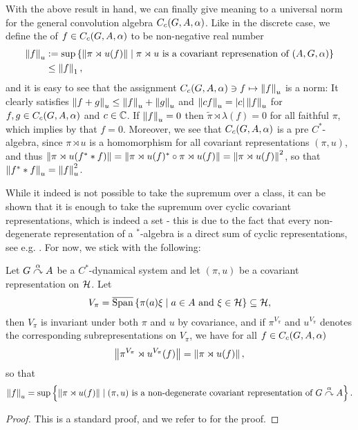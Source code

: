 With the above result in hand, we can finally give meaning to a universal norm for the general convolution algebra $C_c(G,A,\alpha)$. Like in the discrete case, we define the  of $f \in C_c(G,A,\alpha)$ to be non-negative real number
\begin{align*}
	\left\lVert f \right\rVert_u &:= \sup\left\{ \left\lVert \pi \rtimes u (f)\right\rVert \mid  \pi \rtimes u \text{ is a covariant represenation of }(A,G ,\alpha) \right\}\\
	&\leq \left\lVert f \right\rVert_1,
\end{align*}
and it is easy to see that the assignment $C_c(G,A,\alpha) \ni f \mapsto \left\lVert f \right\rVert_u$ is a norm: It clearly satisfies $\left\lVert f + g \right\rVert_u \leq \left\lVert f \right\rVert_u + \left\lVert g \right\rVert_u$ and $\left\lVert cf \right\rVert_u = |c| \left\lVert f \right\rVert_u$ for $f,g \in C_c(G,A,\alpha)$ and $c \in \mathbb{C}$. If $\left\lVert f \right\rVert_u = 0$ then $\tilde{\pi} \rtimes \lambda (f) = 0$ for all faithful $\pi$, which implies by  that $f = 0$. Moreover, we see that $C_c(G,A,\alpha)$ is a pre $C^*$-algebra, since $\pi \rtimes u$ is a homomorphism for all covariant representations $(\pi,u)$, and thus $\left\lVert \pi \rtimes u (f^*\ast f)\right\rVert = \left\lVert \pi \rtimes u(f)^* \circ \pi \rtimes u(f)\right\rVert = \left\lVert \pi \rtimes u (f)\right\rVert^2$, so that $\left\lVert f^* \ast f\right\rVert_u = \left\lVert f \right\rVert_u^2$. 
\begin{note}
	While it indeed is not possible to take the supremum over a class, it can be shown that it is enough to take the supremum over cyclic covariant representations, which is indeed a set - this is due to the fact that every non-degenerate representation of a $^*$-algebra is a direct sum of cyclic representations, see e.g. \cite[Theorem 5.1.3]{murphy2014c}. For now, we stick with the following:
\end{note}
\begin{lemma}
	Let $G \stackrel{\alpha}{\curvearrowright} A$ be a $C^*$-dynamical system and let $(\pi,u)$ be a covariant representation on $\mathcal{H}$. Let 
	\begin{align*}
		V_\pi = \overline {\mathrm{Span}}\left\{ \pi(a) \xi \mid a \in A \text{ and } \xi \in \mathcal{H} \right\} \subseteq \mathcal{H},
	\end{align*}
	then $V_\pi$ is invariant under both $\pi$ and $u$ by covariance, and if $\pi^{V_\pi}$ and $ u^{V_\pi}$ denotes the corresponding subrepresentations on $V_{\pi}$, we have for all $f \in C_c(G,A,\alpha)$ 
	\begin{align*}
		\left\lVert \pi ^{V_\pi} \rtimes u^{V_\pi}(f) \right\rVert = \left\lVert \pi \rtimes u (f) \right\rVert,
	\end{align*}
	so that
	\begin{align*}
		\left\lVert f \right\rVert_u = \sup\left\{ \left\lVert \pi \rtimes u(f) \right\rVert \mid  (\pi,u) \text{ is a non-degenerate covariant representation of } G \stackrel{\alpha}{\curvearrowright} A\right\}.
	\end{align*}
	\label{cross:essnorm}
\end{lemma}
\begin{proof}
	This is a standard proof, and we refer to \cite[52]{williamscrossed} for the proof.
\end{proof}

